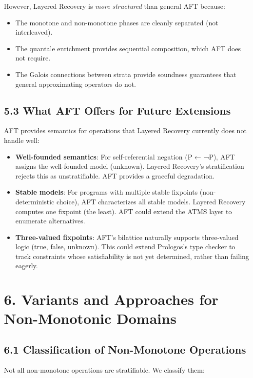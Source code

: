 \documentclass[11pt]{article}
\begin{document}
However, Layered Recovery is \emph{more structured} than general AFT because:
\begin{itemize}
\item The monotone and non-monotone phases are cleanly separated (not interleaved).
\item The quantale enrichment provides sequential composition, which AFT does not
require.
\item The Galois connections between strata provide soundness guarantees that
general approximating operators do not.
\end{itemize}
\subsection{5.3 What AFT Offers for Future Extensions}
\label{sec:org7dd2d02}

AFT provides semantics for operations that Layered Recovery currently does not
handle well:

\begin{itemize}
\item \textbf{Well-founded semantics}: For self-referential negation (P ← ¬P), AFT assigns
the well-founded model (unknown). Layered Recovery's stratification rejects
this as unstratifiable. AFT provides a graceful degradation.
\item \textbf{Stable models}: For programs with multiple stable fixpoints (non-deterministic
choice), AFT characterizes all stable models. Layered Recovery computes one
fixpoint (the least). AFT could extend the ATMS layer to enumerate alternatives.
\item \textbf{Three-valued fixpoints}: AFT's bilattice naturally supports three-valued logic
(true, false, unknown). This could extend Prologos's type checker to track
constraints whose satisfiability is not yet determined, rather than failing
eagerly.
\end{itemize}
\section{6. Variants and Approaches for Non-Monotonic Domains}
\label{sec:orgefa7a79}

\subsection{6.1 Classification of Non-Monotone Operations}
\label{sec:org416f26a}

Not all non-monotone operations are stratifiable. We classify them:
\end{document}
